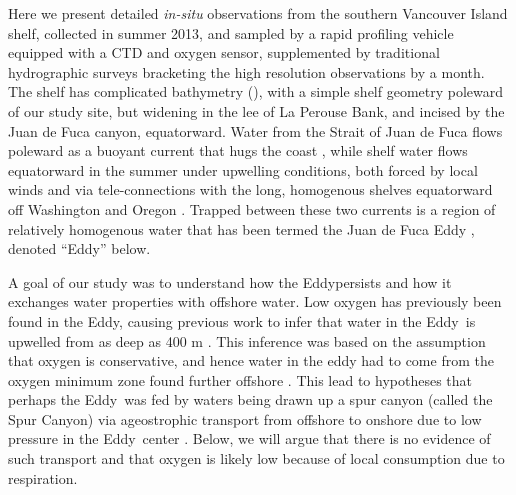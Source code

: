 \documentclass[draft]{agujournal2019}
\newcommand*{\Eddy}{{\sc Eddy}}
\begin{document}
Here we present detailed \emph{in-situ} observations from the southern Vancouver Island shelf, collected in summer 2013, and sampled by a rapid profiling vehicle equipped with a CTD and oxygen sensor, supplemented by traditional hydrographic surveys bracketing the high resolution observations by a month. The shelf has complicated bathymetry (), with a simple shelf geometry poleward of our study site, but widening in the lee of La Perouse Bank, and incised by the Juan de Fuca canyon, equatorward.  Water from the Strait of Juan de Fuca flows poleward as a buoyant current that hugs the coast \cite{thomsonetal89, hickeyetal91}, while shelf water flows equatorward in the summer under upwelling conditions, both forced by local winds and via tele-connections with the long, homogenous shelves equatorward off Washington and Oregon \cite{hickeyetal91,thomsonkrassovski15,engidaetal16}.  Trapped between these two currents is a region of relatively homogenous water that has been termed the Juan de Fuca Eddy \cite{freelanddenman82,freelandmcintosh89,foremanetal07,macfadyenhickey10}, denoted ``\Eddy'' below.

A goal of our study was to understand how the \Eddy persists and how it exchanges water properties with offshore water.  Low oxygen has previously been found in the \Eddy, causing previous work to infer that water in the \Eddy\ is upwelled from as deep as 400 m \cite{freelanddenman82,deweycrawford88}.  This inference was based on the assumption that oxygen is conservative, and hence water in the eddy had to come from  the oxygen minimum zone found further offshore \cite{mackasetal87}.  This lead to hypotheses that perhaps the \Eddy\ was fed by waters being drawn up a spur canyon (called the Spur Canyon) via ageostrophic transport from offshore to onshore due to low pressure in the \Eddy\ center \cite{weaverhsieh87}.  Below, we will argue that there is no evidence of such transport and that oxygen is likely low because of local consumption due to respiration.
\end{document}
